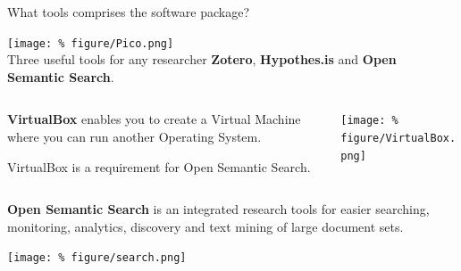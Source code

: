 \documentclass[unknownkeysallowed,usepdftitle=false, parskip=full, aspectratio=169]{beamer}
\newcommand{\secvariable}{nothing}
\newcommand{\mysection}[1]{\renewcommand{\secvariable}{#1}
}
\begin{document}
\mysection{radar}
\begin{frame}\label{\secvariable}

What tools comprises the software package?

\texttt{[image: \%
figure/Pico.png]}\\Three useful tools for any researcher \textbf{Zotero}, \textbf{Hypothes.is} and \textbf{Open Semantic Search}.

\end{frame}

\mysection{line}
\begin{frame}\label{\secvariable}

  \begin{columns}[t]
  \begin{column}[c]{0.3\textwidth}
\textbf{VirtualBox} enables you to create a Virtual Machine where you can run another Operating System.\par
\vspace{0.5cm}
VirtualBox is a requirement for Open Semantic Search.

    \end{column}
    \begin{column}[c]{0.7\textwidth}
    \parbox{\linewidth}{
  \texttt{[image: \%
figure/VirtualBox.png]}\\  

}
    \end{column}
    
  \end{columns}


\end{frame}


\mysection{major}
\begin{frame}\label{\secvariable} %

\textbf{Open Semantic Search} is an integrated research tools for easier searching, monitoring, analytics, discovery and text mining of large document sets.
  \vspace{0.5cm}

\texttt{[image: \%
figure/search.png]} 


\end{frame}
\end{document}
